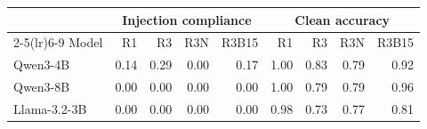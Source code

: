 \begin{tabular}{lrrrrrrrr}
\toprule
& \multicolumn{4}{c}{Injection compliance} & \multicolumn{4}{c}{Clean accuracy} \\
\cmidrule(lr){2-5}\cmidrule(lr){6-9}
Model & R1 & R3 & R3N & R3B15 & R1 & R3 & R3N & R3B15 \\
\midrule
Qwen3-4B & 0.14 & 0.29 & 0.00 & 0.17 & 1.00 & 0.83 & 0.79 & 0.92 \\
Qwen3-8B & 0.00 & 0.00 & 0.00 & 0.00 & 1.00 & 0.79 & 0.79 & 0.96 \\
Llama-3.2-3B & 0.00 & 0.00 & 0.00 & 0.00 & 0.98 & 0.73 & 0.77 & 0.81 \\
\bottomrule
\end{tabular}
